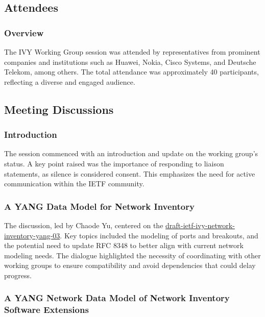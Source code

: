 \documentclass{article}
\begin{document}
\subsection{Attendees}

\subsubsection{Overview}

The IVY Working Group session was attended by representatives from prominent companies and institutions such as Huawei, Nokia, Cisco Systems, and Deutsche Telekom, among others. The total attendance was approximately 40 participants, reflecting a diverse and engaged audience.

\subsection{Meeting Discussions}

\subsubsection{Introduction}

The session commenced with an introduction and update on the working group's status. A key point raised was the importance of responding to liaison statements, as silence is considered consent. This emphasizes the need for active communication within the IETF community.

\subsubsection{A YANG Data Model for Network Inventory}

The discussion, led by Chaode Yu, centered on the \href{https://datatracker.ietf.org/doc/html/draft-ietf-ivy-network-inventory-yang-03}{draft-ietf-ivy-network-inventory-yang-03}. Key topics included the modeling of ports and breakouts, and the potential need to update RFC 8348 to better align with current network modeling needs. The dialogue highlighted the necessity of coordinating with other working groups to ensure compatibility and avoid dependencies that could delay progress.

\subsubsection{A YANG Network Data Model of Network Inventory Software Extensions}
\end{document}
